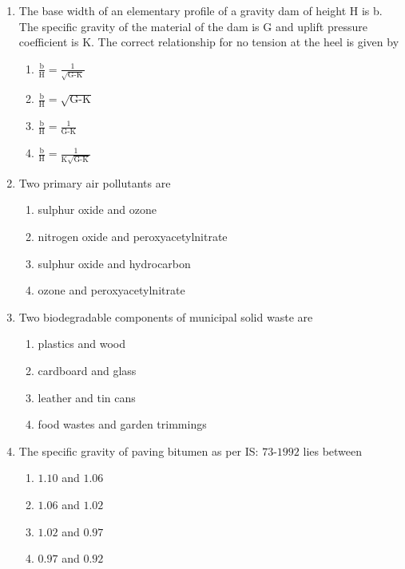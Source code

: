 \documentclass[journal,12pt,onecolumn]{IEEEtran}
\theoremstyle{remark}
\begin{document}
\begin{enumerate}
\item The base width of an elementary profile of a gravity dam of height H is b. The specific gravity of the material of the dam is G and uplift pressure coefficient is K. The correct relationship for no tension at the heel is given by

\begin{enumerate}
	\item $\frac{\text{b}}{\text{H}} = \frac{1}{\sqrt{\text{G-K}}}$
	\item $\frac{\text{b}}{\text{H}} = \sqrt{\text{G-K}}$
	\item $\frac{\text{b}}{\text{H}} = \frac{1}{\text{G-K}}$
	\item $\frac{\text{b}}{\text{H}} = \frac{1}{\text{K}\sqrt{\text{G-K}}}$
\end{enumerate}

\item Two primary air pollutants are

\begin{enumerate}
	\item sulphur oxide and ozone
	\item nitrogen oxide and peroxyacetylnitrate
	\item sulphur oxide and hydrocarbon
	\item ozone and peroxyacetylnitrate
\end{enumerate}

\item Two biodegradable components of municipal solid waste are

\begin{enumerate}
	\item plastics and wood
	\item cardboard and glass
	\item leather and tin cans
	\item food wastes and garden trimmings
\end{enumerate}

\item The specific gravity of paving bitumen as per IS: $73$-$1992$ lies between

\begin{enumerate}
	\item $1.10$ and $1.06$
	\item $1.06$ and $1.02$
	\item $1.02$ and $0.97$
	\item $0.97$ and $0.92$
\end{enumerate}


\end{enumerate}
\end{document}
